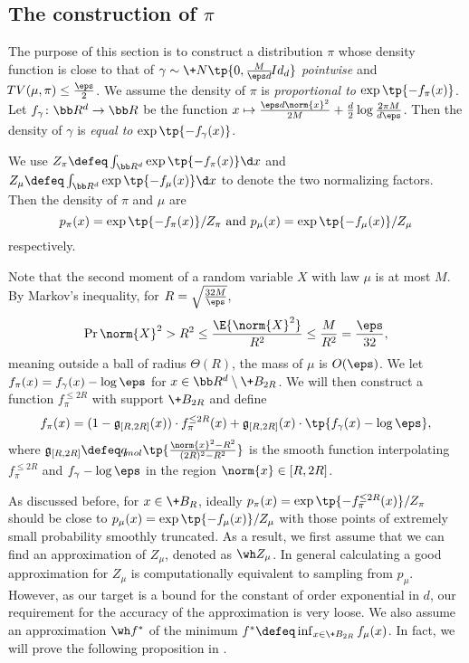 \subsection{The construction of $\pi$}\label{sec:construction-of-pi}

The purpose of this section is to construct a distribution $\pi$ whose density function is close to that of $\gamma\sim\+N\tp{0,\frac{M}{\eps d}\!{Id}_d}$ \emph{pointwise} and $\DTV(\mu,\pi)\le \frac{\eps}{2}$. We assume the density of $\pi$ is \emph{proportional to} $\exp\tp{-f_\pi(x)}$. Let $f_\gamma\colon \bb R^d\to\bb R$ be the function $x\mapsto \frac{\eps d\norm{x}^2}{2M}+\frac{d}{2}\log\frac{2\pi M}{d\eps}$. Then the density of $\gamma$ is \emph{equal to} $\exp\tp{-f_\gamma(x)}$.

We use $Z_\pi \defeq \int_{\bb R^d} \exp\tp{-f_\pi(x)}\d x$ and $Z_\mu\defeq \int_{\bb R^d} \exp\tp{-f_\mu(x)} \d x$ to denote the two normalizing factors. Then the density of $\pi$ and $\mu$ are
\[
    p_\pi(x) = \exp\tp{-f_\pi(x)} / Z_\pi \mbox{ and } p_{\mu}(x) = \exp\tp{-f_{\mu}(x)} / Z_\mu
\]
respectively.

Note that the second moment of a random variable $X$ with law $\mu$ is at most $M$. By Markov's inequality, for $R=\sqrt{\frac{32M}{\eps}}$,
\begin{equation}\label{eqn:markov-mu}
    \Pr{\norm{X}^2>R^2} \le \frac{\E{\norm{X}^2}}{R^2}\le \frac{M}{R^2} = \frac{\eps}{32},
\end{equation}
meaning outside a ball of radius $\Theta(R)$, the mass of $\mu$ is $O(\eps)$. We let $f_\pi(x) = f_\gamma(x) - \log\eps$ for $x\in \bb R^d \setminus \+B_{2R}$. We will then construct a function $f_\pi^{\le 2R}$ with support $\+B_{2R}$ and define
\[
    f_\pi(x) = (1-\mathfrak{g}_{[R,2R]}(x)) \cdot f_\pi^{\le 2R}(x) + \mathfrak{g}_{[R,2R]}(x) \cdot \tp{f_\gamma(x)-\log\eps},
\]
where $\mathfrak{g}_{[R,2R]}\defeq q_{\!{mol}}\tp{\frac{\norm{x}^2-R^2}{(2R)^2-R^2}}$ is the smooth function interpolating $f_\pi^{\le 2R}$ and $f_\gamma - \log\eps$ in the region $\norm{x}\in [R,2R]$. 

As discussed before, for $x\in \+B_R$, ideally $p_{\pi}(x) = \exp\tp{-f_{\pi}^{\le 2R}(x)} / Z_\pi$ should be close to $p_{\mu}(x) = \exp\tp{-f_\mu(x)} / Z_\mu$ with those points of extremely small probability smoothly truncated. As a result, we first assume that we can find an approximation of $Z_\mu$, denoted as $\wh Z_\mu$. In general calculating a good approximation for $Z_\mu$ is computationally equivalent to sampling from $p_\mu$. However, as our target is a bound for the \Poincare constant of order exponential in $d$, our requirement for the accuracy of the approximation is very loose. We also assume an approximation $\wh f^*$ of the minimum $f^*\defeq \inf_{x\in \+B_{2R}} f_\mu(x)$. In fact, we will prove the following proposition in .

